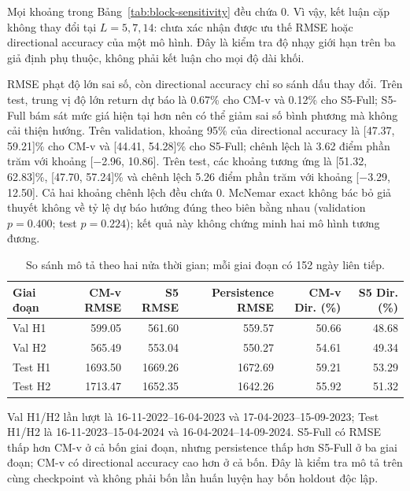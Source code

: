 \documentclass[13pt,a4paper,oneside]{report}
\begin{document}
Mọi khoảng trong Bảng~\ref{tab:block-sensitivity} đều chứa 0. Vì vậy, kết luận cặp không thay đổi
tại $L=\num{5},\num{7},\num{14}$: chưa xác nhận được ưu thế RMSE hoặc directional accuracy của một
mô hình. Đây là kiểm tra độ nhạy giới hạn trên ba giả định phụ thuộc, không phải kết luận cho mọi độ
dài khối.

RMSE phạt độ lớn sai số, còn directional accuracy chỉ so sánh dấu thay đổi. Trên test, trung vị
độ lớn return dự báo là \num{0.67}\% cho CM-v và \num{0.12}\% cho S5-Full; S5-Full bám sát mức giá
hiện tại hơn nên có thể giảm sai số bình phương mà không cải thiện hướng. Trên validation, khoảng
95\% của directional accuracy là [\num{47.37}, \num{59.21}]\% cho CM-v và
[\num{44.41}, \num{54.28}]\% cho S5-Full; chênh lệch là \num{3.62} điểm phần trăm với khoảng
[\num{-2.96}, \num{10.86}]. Trên test, các khoảng tương ứng là
[\num{51.32}, \num{62.83}]\%, [\num{47.70}, \num{57.24}]\% và chênh lệch \num{5.26} điểm phần
trăm với khoảng [\num{-3.29}, \num{12.50}]. Cả hai khoảng chênh lệch đều chứa 0. McNemar exact
không bác bỏ giả thuyết không về tỷ lệ dự báo hướng đúng theo biên bằng nhau (validation
$p=\num{0.400}$; test $p=\num{0.224}$); kết quả này không chứng minh hai mô hình tương đương.

\begin{table}[H]
\centering
\caption{So sánh mô tả theo hai nửa thời gian; mỗi giai đoạn có 152 ngày liên tiếp.}
\label{tab:temporal-stability}
{\scriptsize
\begin{tabular}{@{}lrrrrr@{}}
\toprule
\textbf{Giai đoạn} & \textbf{CM-v RMSE} & \textbf{S5 RMSE} & \textbf{Persistence RMSE} & \textbf{CM-v Dir. (\%)} & \textbf{S5 Dir. (\%)} \\
\midrule
Val H1 & \num{599.05} & \num{561.60} & \num{559.57} & \num{50.66} & \num{48.68} \\
Val H2 & \num{565.49} & \num{553.04} & \num{550.27} & \num{54.61} & \num{49.34} \\
Test H1 & \num{1693.50} & \num{1669.26} & \num{1672.69} & \num{59.21} & \num{53.29} \\
Test H2 & \num{1713.47} & \num{1652.35} & \num{1642.26} & \num{55.92} & \num{51.32} \\
\bottomrule
\end{tabular}}
\end{table}

Val H1/H2 lần lượt là 16-11-2022--16-04-2023 và 17-04-2023--15-09-2023; Test H1/H2 là
16-11-2023--15-04-2024 và 16-04-2024--14-09-2024. S5-Full có RMSE thấp hơn CM-v ở cả bốn giai
đoạn, nhưng persistence thấp hơn S5-Full ở ba giai đoạn; CM-v có directional accuracy cao hơn ở cả
bốn. Đây là kiểm tra mô tả trên cùng checkpoint và không phải bốn lần huấn luyện hay bốn holdout độc
lập.
\end{document}

